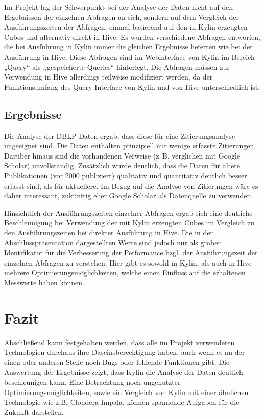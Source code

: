 \documentclass[a4paper,11pt,utf8]{scrartcl}
\begin{document}
Im Projekt lag der Schwerpunkt bei der Analyse der Daten nicht auf den Ergebnissen der einzelnen Abfragen an sich, sondern auf dem Vergleich der Ausführungszeiten der Abfragen, einmal basierend auf den in Kylin erzeugten Cubes und alternativ direkt in Hive. Es wurden verschiedene Abfragen entworfen, die bei Ausführung in Kylin immer die gleichen Ergebnisse lieferten wie bei der Ausführung in Hive. Diese Abfragen sind im Webinterface von Kylin im Bereich „Query“ als „gespeicherte Queries“ hinterlegt. Die Abfragen müssen zur Verwendung in Hive allerdings teilweise modifiziert werden, da der Funktionsumfang des Query-Interface von Kylin und von Hive unterschiedlich ist.

\subsection{Ergebnisse}

Die Analyse der DBLP Daten ergab, dass diese für eine Zitierungsanalyse ungeeignet sind. Die Daten enthalten prinzipiell nur wenige erfasste Zitierungen. Darüber hinaus sind die vorhandenen Verweise (z.\,B. verglichen mit Google Scholar) unvollständig. Zusätzlich wurde deutlich, dass die Daten für ältere Publikationen (vor 2000 publiziert) qualitativ und quantitativ deutlich besser erfasst sind, als für aktuellere. Im Bezug auf die Analyse von Zitierungen wäre es daher interessant, zukünftig eher Google Scholar als Datenquelle zu verwenden.

Hinsichtlich der Ausführungszeiten einzelner Abfragen ergab sich eine deutliche Beschleunigung bei Verwendung der mit Kylin erzeugten Cubes im Vergleich zu den Ausführungszeiten bei direkter Ausführung in Hive. Die in der Abschlusspräsentation dargestellten Werte sind jedoch nur als grober Identifikator für die Verbesserung der Performance bzgl. der Ausführungszeit der einzelnen Abfragen zu verstehen. Hier gibt es sowohl in Kylin, als auch in Hive mehrere Optimierungsmöglichkeiten, welche einen Einfluss auf die erhaltenen Messwerte haben können.

\section{Fazit}

Abschließend kann festgehalten werden, dass alle im Projekt verwendeten Technologien durchaus ihre Daseinsberechtigung haben, auch wenn es an der einen oder anderen Stelle noch Bugs oder fehlende Funktionen gibt. Die Auswertung der Ergebnisse zeigt, dass Kylin die Analyse der Daten deutlich beschleunigen kann. Eine Betrachtung noch ungenutzter Optimierungsmöglichkeiten, sowie ein Vergleich von Kylin mit einer ähnlichen Technologie wie z.B. Cloudera Impala, können spannende Aufgaben für die Zukunft darstellen.
\end{document}
